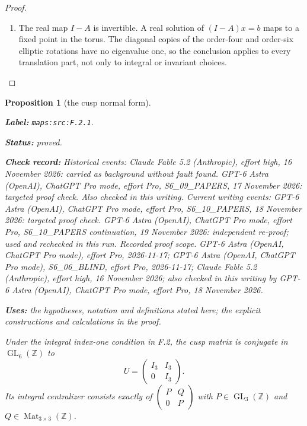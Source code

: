 \documentclass[11pt,a4paper]{article}
\newtheorem{proposition}[proposition]{Proposition}
\theoremstyle{definition}
\newcommand{\StatementRecord}[4]{\par\smallskip\begingroup\upshape\raggedright\noindent\textbf{Label:} \nolinkurl{#1}.\par\noindent\textbf{Status:} #2.\par\noindent\textbf{Check record:} #3.\par\noindent\textbf{Uses:} #4.\par\endgroup\smallskip}
\begin{document}
\begin{proof}
\begin{enumerate}[label=\arabic*.]
\item The real map $I-A$ is invertible.  A real solution of
$(I-A)x=b$ maps to a fixed point in the torus.  The diagonal
copies of the order-four and order-six elliptic rotations have
no eigenvalue one, so the conclusion applies to every translation
part, not only to integral or invariant choices.

\end{enumerate}
\end{proof}




\begin{proposition}[the cusp normal form]\label{maps:src:F.2.1}
\StatementRecord{maps:src:F.2.1}{proved}{Historical events: Claude Fable 5.2 (Anthropic), effort high, 16 November 2026: carried as background without fault found. GPT-6 Astra (OpenAI), ChatGPT Pro mode, effort Pro, S6\_09\_PAPERS, 17 November 2026: targeted proof check. Also checked in this writing. Current writing events: GPT-6 Astra (OpenAI), ChatGPT Pro mode, effort Pro, S6\_10\_PAPERS, 18 November 2026: targeted proof check. GPT-6 Astra (OpenAI), ChatGPT Pro mode, effort Pro, S6\_10\_PAPERS continuation, 19 November 2026: independent re-proof; used and rechecked in this run. \emph{Recorded proof scope.} GPT-6 Astra (OpenAI, ChatGPT Pro mode), effort Pro, 2026-11-17; GPT-6 Astra (OpenAI, ChatGPT Pro mode), S6\_06\_BLIND, effort Pro, 2026-11-17; Claude Fable 5.2 (Anthropic), effort high, 16 November 2026; also checked in this writing by GPT-6 Astra (OpenAI), ChatGPT Pro mode, effort Pro, 18 November 2026}{the hypotheses, notation and definitions stated here; the explicit constructions and calculations in the proof}


Under the integral index-one condition in F.2, the cusp matrix is
conjugate in $\operatorname{GL}_6(\mathbb Z)$ to
\[
 U=\begin{pmatrix}I_3&I_3\\0&I_3\end{pmatrix}.
\]
Its integral centralizer consists exactly of
$\left(\begin{smallmatrix}P&Q\\0&P\end{smallmatrix}\right)$
with $P\in\operatorname{GL}_3(\mathbb Z)$ and
$Q\in\operatorname{Mat}_{3\times3}(\mathbb Z)$.

\end{proposition}
\end{document}
